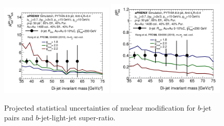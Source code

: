 \begin{figure}[htbp]
\centering
\includegraphics[width=0.48\textwidth]{figs/200pp_pythia8_CTEQ6L_7GeV_ALL_cfg_eneg_DSTReader_root_Draw_HFJetTruth_InvMass_CrossSection2RAARatio_Theory_3yr_deta0_70.pdf}
\includegraphics[width=0.5\textwidth]{figs/200pp_pythia8_CTEQ6L_7GeV_ALL_cfg_eneg_DSTReader_root_Draw_HFJetTruth_InvMass_CrossSection2RAA_Theory_3yr_deta0_70.pdf}
\caption{Projected statistical uncertainties of nuclear modification for $b$-jet pairs and $b$-jet-light-jet super-ratio.}
\label{fig:HF-bjet-pair}
\end{figure}




